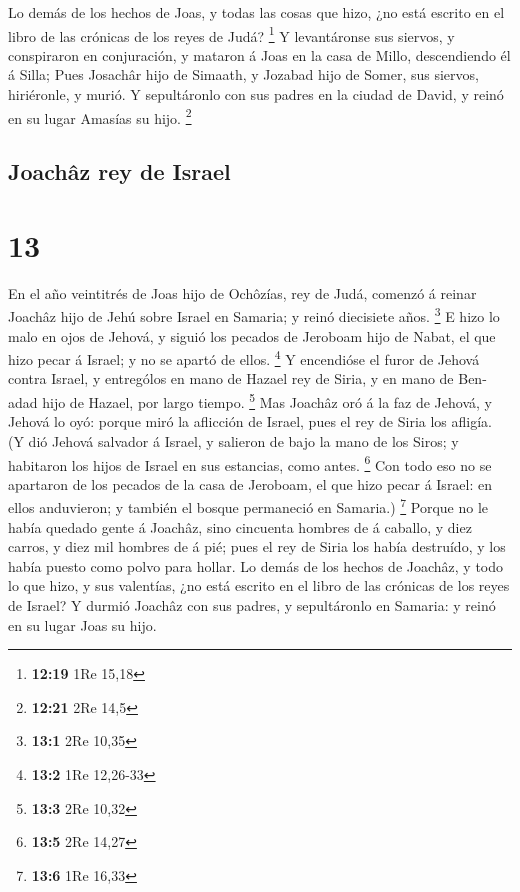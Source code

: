 Lo demás de los hechos de Joas, y todas las cosas que
hizo, ¿no está escrito en el libro de las crónicas de los reyes de Judá?
\footnote{\textbf{12:19} 1Re 15,18}  Y levantáronse sus
siervos, y conspiraron en conjuración, y mataron á Joas en la casa de
Millo, descendiendo él á Silla;  Pues Josachâr hijo de
Simaath, y Jozabad hijo de Somer, sus siervos, hiriéronle, y murió. Y
sepultáronlo con sus padres en la ciudad de David, y reinó en su lugar
Amasías su hijo. \footnote{\textbf{12:21} 2Re 14,5}

\hypertarget{joachuxe2z-rey-de-israel}{%
\subsection{Joachâz rey de Israel}\label{joachuxe2z-rey-de-israel}}

\hypertarget{section-12}{%
\section{13}\label{section-12}}

 En el año veintitrés de Joas hijo de Ochôzías, rey de
Judá, comenzó á reinar Joachâz hijo de Jehú sobre Israel en Samaria; y
reinó diecisiete años. \footnote{\textbf{13:1} 2Re 10,35} 
E hizo lo malo en ojos de Jehová, y siguió los pecados de Jeroboam hijo
de Nabat, el que hizo pecar á Israel; y no se apartó de ellos.
\footnote{\textbf{13:2} 1Re 12,26-33}  Y encendióse el
furor de Jehová contra Israel, y entrególos en mano de Hazael rey de
Siria, y en mano de Ben-adad hijo de Hazael, por largo tiempo.
\footnote{\textbf{13:3} 2Re 10,32}  Mas Joachâz oró á la
faz de Jehová, y Jehová lo oyó: porque miró la aflicción de Israel, pues
el rey de Siria los afligía.  (Y dió Jehová salvador á
Israel, y salieron de bajo la mano de los Siros; y habitaron los hijos
de Israel en sus estancias, como antes. \footnote{\textbf{13:5} 2Re
  14,27}  Con todo eso no se apartaron de los pecados de
la casa de Jeroboam, el que hizo pecar á Israel: en ellos anduvieron; y
también el bosque permaneció en Samaria.) \footnote{\textbf{13:6} 1Re
  16,33}  Porque no le había quedado gente á Joachâz, sino
cincuenta hombres de á caballo, y diez carros, y diez mil hombres de á
pié; pues el rey de Siria los había destruído, y los había puesto como
polvo para hollar.  Lo demás de los hechos de Joachâz, y
todo lo que hizo, y sus valentías, ¿no está escrito en el libro de las
crónicas de los reyes de Israel?  Y durmió Joachâz con sus
padres, y sepultáronlo en Samaria: y reinó en su lugar Joas su hijo.

